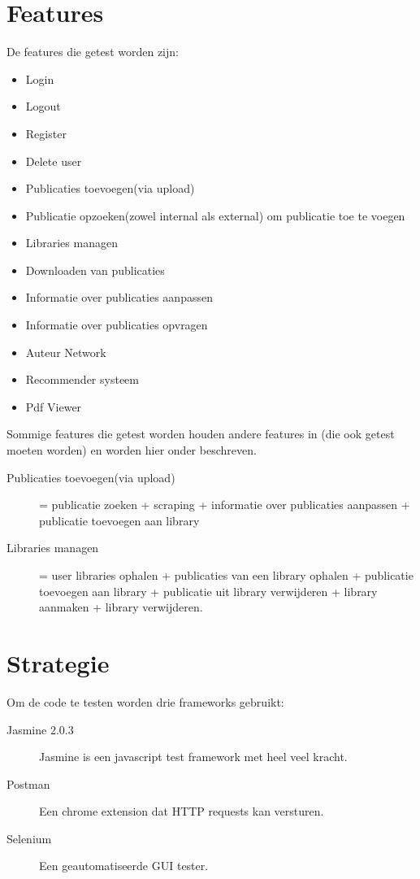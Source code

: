 \documentclass{article}
\begin{document}
\section{Features}
De features die getest worden zijn:
\begin{itemize}
  \item Login 
  \item Logout 
  \item Register
  \item Delete user
  \item Publicaties toevoegen(via upload)
  \item Publicatie opzoeken(zowel internal als external) om publicatie toe te voegen
  \item Libraries managen
  \item Downloaden van publicaties
  \item Informatie over publicaties aanpassen
  \item Informatie over publicaties opvragen
  \item Auteur Network
  \item Recommender systeem
  \item Pdf Viewer
\end{itemize}
Sommige features die getest worden houden andere features in (die ook getest moeten worden) en worden hier onder beschreven.\\
\begin{description}
\item[Publicaties toevoegen(via upload)] = publicatie zoeken + scraping + informatie over publicaties aanpassen + publicatie toevoegen aan library
\item[Libraries managen] = user libraries ophalen + publicaties van een library ophalen + publicatie toevoegen aan library + publicatie uit library verwijderen + library aanmaken + library verwijderen.
\end{description}
%
\section{Strategie}
Om de code te testen worden drie frameworks gebruikt: 
\begin{description}
  \item[Jasmine 2.0.3] Jasmine is een javascript test framework met heel veel kracht.
  \item[Postman] Een chrome extension dat HTTP requests kan versturen. 
  \item[Selenium] Een geautomatiseerde GUI tester.
\end{description}
\end{document}
